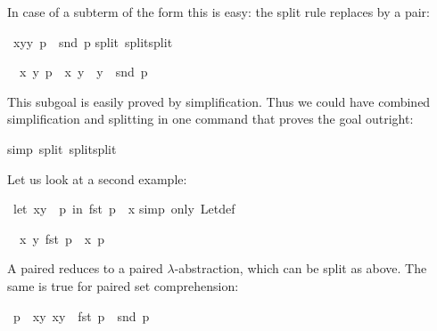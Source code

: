 \begin{isabellebody}
\begin{isamarkuptext}
In case of a subterm of the form  this is easy: the split
rule  replaces  by a pair:%
%
\end{isamarkuptext}%
\isamarkuptrue%
\ {\isachardoublequote}{\isacharparenleft}{\isasymlambda}{\isacharparenleft}x{\isacharcomma}y{\isacharparenright}{\isachardot}y{\isacharparenright}\ p\ {\isacharequal}\ snd\ p{\isachardoublequote}\isanewline
\isamarkupfalse%
split\ split{\isacharunderscore}split{\isacharparenright}\isamarkupfalse%
%
\begin{isamarkuptxt}%
\begin{isabelle}%
\ {}{\isachardot}\ {\isasymforall}x\ y{\isachardot}\ p\ {\isacharequal}\ {\isacharparenleft}x{\isacharcomma}\ y{\isacharparenright}\ {\isasymlongrightarrow}\ y\ {\isacharequal}\ snd\ p%
\end{isabelle}
This subgoal is easily proved by simplification. Thus we could have combined
simplification and splitting in one command that proves the goal outright:%
\end{isamarkuptxt}%
\isamarkuptrue%
\isamarkupfalse%
\isamarkupfalse%
simp\ split{\isacharcolon}\ split{\isacharunderscore}split{\isacharparenright}\isamarkupfalse%
%
\begin{isamarkuptext}%
Let us look at a second example:%
\end{isamarkuptext}%
\isamarkuptrue%
\ {\isachardoublequote}let\ {\isacharparenleft}x{\isacharcomma}y{\isacharparenright}\ {\isacharequal}\ p\ in\ fst\ p\ {\isacharequal}\ x{\isachardoublequote}\isanewline
\isamarkupfalse%
simp\ only{\isacharcolon}\ Let{\isacharunderscore}def{\isacharparenright}\isamarkupfalse%
%
\begin{isamarkuptxt}%
\begin{isabelle}%
\ {}{\isachardot}\ {\isacharparenleft}{\isasymlambda}{\isacharparenleft}x{\isacharcomma}\ y{\isacharparenright}{\isachardot}\ fst\ p\ {\isacharequal}\ x{\isacharparenright}\ p%
\end{isabelle}
A paired  reduces to a paired $\lambda$-abstraction, which
can be split as above. The same is true for paired set comprehension:%
\end{isamarkuptxt}%
\isamarkuptrue%
\isamarkupfalse%
\ {\isachardoublequote}p\ {\isasymin}\ {\isacharbraceleft}{\isacharparenleft}x{\isacharcomma}y{\isacharparenright}{\isachardot}\ x{\isacharequal}y{\isacharbraceright}\ {\isasymlongrightarrow}\ fst\ p\ {\isacharequal}\ snd\ p{\isachardoublequote}\isanewline

\end{isabellebody}
